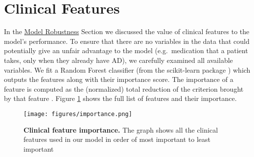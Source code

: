 \section{Clinical Features}
\label{section:clinical}
In the {\hyperref[subsection:robust]{Model Robustness} Section} we discussed the value of clinical features to the model's performance. To ensure that there are no variables in the data that could potentially give an unfair advantage to the model (e.g.\ medication that a patient takes, only when they already have AD), we carefully examined all available variables. We fit a Random Forest classifier (from the scikit-learn package \cite{sklearn_api}) which outputs the features along with their importance score. The importance of a feature is computed as the (normalized) total reduction of the criterion brought by that feature \cite{sklearn_api}. Figure \ref{fig:clinical_imp} shows the full list of features and their importance. 

\begin{figure}[H]
\begin{center}
    \caption{\textbf{Clinical feature importance.} The graph shows all the clinical features used in our model in order of most important to least important}
    \label{fig:clinical_imp}
  \texttt{[image: figures/importance.png]}
  \end{center}
\end{figure}

\newpage
